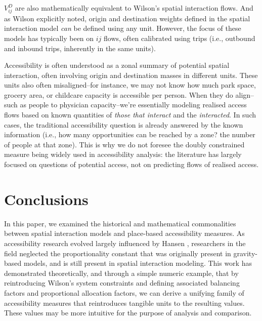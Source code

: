\documentclass[
  10pt,
  letterpaper,
]{article}
\begin{document}
\(V_{ij}^D\) are also mathematically equivalent to Wilson's spatial
interaction flows. And as Wilson \citep{wilson1971} explicitly noted,
origin and destination weights defined in the spatial interaction model
\emph{can} be defined using any unit. However, the focus of these models
has typically been on \(ij\) flows, often calibrated using trips (i.e.,
outbound and inbound trips, inherently in the same units).

Accessibility is often understood as a zonal summary of potential
spatial interaction, often involving origin and destination masses in
different units. These units also often misaligned--for instance, we may
not know how much park space, grocery area, or childcare capacity is
accessible per person. When they do align--such as people to physician
capacity--we're essentially modeling realised access flows based on
known quantities of \emph{those that interact} and the
\emph{interacted}. In such cases, the traditional accessibility question
is already answered by the known information (i.e., how many
opportunities can be reached by a zone? the number of people at that
zone). This is why we do not foresee the doubly constrained measure
being widely used in accessibility analysis: the literature has largely
focused on questions of potential access, not on predicting flows of
realised access.

\section{Conclusions}\label{conclusions}

In this paper, we examined the historical and mathematical commonalities
between spatial interaction models and place-based accessibility
measures. As accessibility research evolved largely influenced by Hansen
\citep{hansen1959}, researchers in the field neglected the
proportionality constant that was originally present in gravity-based
models, and is still present in spatial interaction modeling. This work
has demonstrated theoretically, and through a simple numeric example,
that by reintroducing Wilson's system constraints and defining
associated balancing factors and proportional allocation factors, we can
derive a unifying family of accessibility measures that reintroduces
tangible units to the resulting values. These values may be more
intuitive for the purpose of analysis and comparison.
\end{document}
